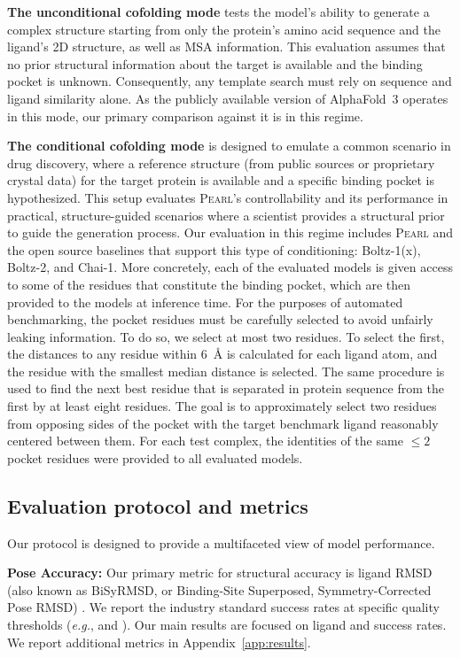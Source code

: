 \documentclass[11pt, letterpaper, onecolumn]{tau-class/tau}
\newcommand{\pearl}{\textsc{Pearl}\xspace}
\newcommand{\alphafold}[1]{AlphaFold~#1\xspace}
\newcommand{\boltz}[1]{\mbox{Boltz-#1\xspace}}
\newcommand{\chai}[1]{\mbox{Chai-#1\xspace}}
\newcommand{\rmsdonea}{\text{RMSD\,\raisebox{0.25ex}{\scriptsize <}\,1\,\AA}\xspace}
\newcommand{\rmsdtwoa}{\text{RMSD\,\raisebox{0.25ex}{\scriptsize <}\,2\,\AA}\xspace}
\newcommand{\eg}{\textit{e.g.}\xspace}
\let\oldAA\AA
\renewcommand{\AA}{\oldAA\xspace}
\begin{document}
\textbf{The unconditional cofolding mode} tests the model's ability to generate a complex structure starting from only the protein's amino acid sequence and the ligand's 2D structure, as well as MSA information.
This evaluation assumes that no prior structural information about the target is available and the binding pocket is unknown.
Consequently, any template search must rely on sequence and ligand similarity alone.
As the publicly available version of \alphafold3 operates in this mode, our primary comparison against it is in this regime.

\textbf{The conditional cofolding mode} is designed to emulate a common scenario in drug discovery, where a reference structure (from public sources or proprietary crystal data) for the target protein is available and a specific binding pocket is hypothesized.
This setup evaluates \pearl's controllability and its performance in practical, structure-guided scenarios where a scientist provides a structural prior to guide the generation process.
Our evaluation in this regime includes \pearl and the open source baselines that support this type of conditioning: \boltz1(x), \boltz2, and \chai1.
More concretely, each of the evaluated models is given access to some of the residues that constitute the binding pocket, which are then provided to the models at inference time.
For the purposes of automated benchmarking, the pocket residues must be carefully selected to avoid unfairly leaking information.
To do so, we select at most two residues.
To select the first, the distances to any residue within 6~\AA is calculated for each ligand atom, and the residue with the smallest median distance is selected.
The same procedure is used to find the next best residue that is separated in protein sequence from the first by at least eight residues.
The goal is to approximately select two residues from opposing sides of the pocket with the target benchmark ligand reasonably centered between them.
For each test complex, the identities of the same $\leq2$ pocket residues were provided to all evaluated models.


\subsection{Evaluation protocol and metrics}
\label{app:eval:metrics}
Our protocol is designed to provide a multifaceted view of model performance.

\textbf{Pose Accuracy:}
Our primary metric for structural accuracy is ligand RMSD (also known as BiSyRMSD, or Binding-Site Superposed, Symmetry-Corrected Pose RMSD) \cite{robin2023assessment}.
We report the industry standard success rates at specific quality thresholds (\eg, \rmsdtwoa and \rmsdonea).
Our main results are focused on ligand \rmsdtwoa and \rmsdonea success rates.
We report additional metrics in Appendix~\ref{app:results}.
\end{document}

